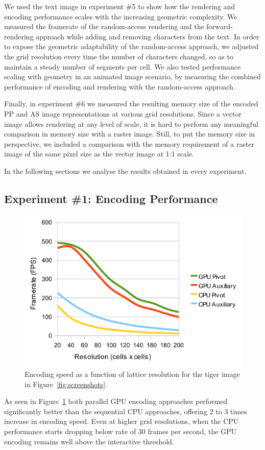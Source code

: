 \documentclass[11pt,a4paper,twoside]{article}
\begin{document}
We used the text image in experiment \#5 to show how the rendering and encoding performance scales with the increasing geometric complexity. We measured the framerate of the random-access rendering and the forward-rendering approach while adding and removing characters from the text. In order to expose the geometric adaptability of the random-access approach, we adjusted the grid resolution every time the number of characters changed, so as to maintain a steady number of segments per cell. We also tested performance scaling with geometry in an animated image scenario, by measuring the combined performance of encoding and rendering with the random-access approach.

Finally, in experiment \#6 we measured the resulting memory size of the encoded PP and AS image representations at various grid resolutions. Since a vector image allows rendering at any level of scale, it is hard to perform any meaningful comparison in memory size with a raster image. Still, to put the memory size in perspective, we included a comparison with the memory requirement of a raster image of the same pixel size as the vector image at 1:1 scale.

In the following sections we analyse the results obtained in every experiment.

\subsection {Experiment \#1: Encoding Performance}

\begin {figure} [h]
	\centering
	\includegraphics[width=0.6\columnwidth] {figures/graph_grid_encode}
	\caption {Encoding speed as a function of lattice resolution for the tiger image in Figure~\ref{fig:screenshots}.}
	\label {fig:graph_grid_encode}
\end {figure}

As seen in Figure~\ref{fig:graph_grid_encode} both parallel GPU encoding approaches performed significantly better than the sequential CPU approaches, offering 2 to 3 times increase in encoding speed. Even at higher grid resolutions, when the CPU performance starts dropping below rate of 30 frames per second, the GPU encoding remains well above the interactive threshold.
\end{document}

